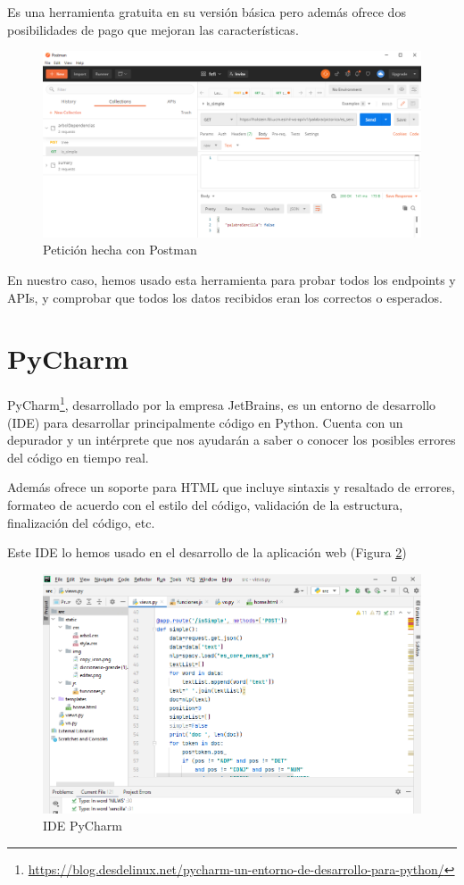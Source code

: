 Es una herramienta gratuita en su versión básica pero además ofrece dos posibilidades de pago que mejoran las características.
	\begin{figure}[h!]
	\centering
	
	
	\includegraphics[scale=0.6]{Imagenes/Figuras/postman}
	
	
	\caption{Petición hecha con Postman}
	\label{fig:postman}
\end{figure}

En nuestro caso, hemos usado esta herramienta para probar todos los endpoints y APIs, y comprobar que todos los datos recibidos eran los correctos o esperados.

\section{PyCharm}

PyCharm\footnote{\href{https://blog.desdelinux.net/pycharm-un-entorno-de-desarrollo-para-python/}{https://blog.desdelinux.net/pycharm-un-entorno-de-desarrollo-para-python/}}, desarrollado por la empresa JetBrains, es un entorno de desarrollo (IDE) para desarrollar principalmente código en Python. Cuenta con un depurador y un intérprete que nos ayudarán a saber o conocer los posibles errores del código en tiempo real. 

Además ofrece un soporte para HTML que incluye sintaxis y resaltado de errores, formateo de acuerdo con el estilo del código, validación de la estructura, finalización del código, etc.

Este IDE lo hemos usado en el desarrollo de la aplicación web (Figura \ref{fig:pycharm})
	\begin{figure}[h!]
	\centering
	
	
	\includegraphics[scale=0.5]{Imagenes/Figuras/pycharm}
	
	
	\caption{IDE PyCharm}
	\label{fig:pycharm}
\end{figure}